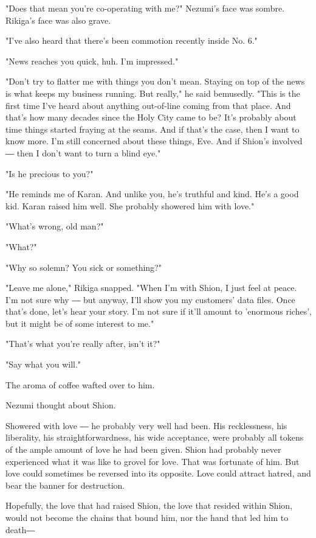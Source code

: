 "Does that mean you're co-operating with me?" Nezumi's face was sombre.
Rikiga's face was also grave.

"I've also heard that there's been commotion recently inside No. 6."

"News reaches you quick, huh. I'm impressed."

"Don't try to flatter me with things you don't mean. Staying on top of
the news is what keeps my business running. But really," he said
bemusedly. "This is the first time I've heard about anything out-of-line
coming from that place. And that's how many decades since the Holy City
came to be? It's probably about time things started fraying at the
seams. And if that's the case, then I want to know more. I'm still
concerned about these things, Eve. And if Shion's involved ― then I
don't want to turn a blind eye."

"Is he precious to you?"

"He reminds me of Karan. And unlike you, he's truthful and kind. He's a
good kid. Karan raised him well. She probably showered him with love."

"What's wrong, old man?"

"What?"

"Why so solemn? You sick or something?"

"Leave me alone," Rikiga snapped. "When I'm with Shion, I just feel at
peace. I'm not sure why ― but anyway, I'll show you my customers' data
files. Once that's done, let's hear your story. I'm not sure if it'll
amount to 'enormous riches', but it might be of some interest to me."

"That's what you're really after, isn't it?"

"Say what you will."

The aroma of coffee wafted over to him.

Nezumi thought about Shion.

Showered with love ― he probably very well had been. His recklessness,
his liberality, his straightforwardness, his wide acceptance, were
probably all tokens of the ample amount of love he had been given. Shion
had probably never experienced what it was like to grovel for love. That
was fortunate of him. But love could sometimes be reversed into its
opposite. Love could attract hatred, and bear the banner for
destruction.

Hopefully, the love that had raised Shion, the love that resided within
Shion, would not become the chains that bound him, nor the hand that led
him to death―

